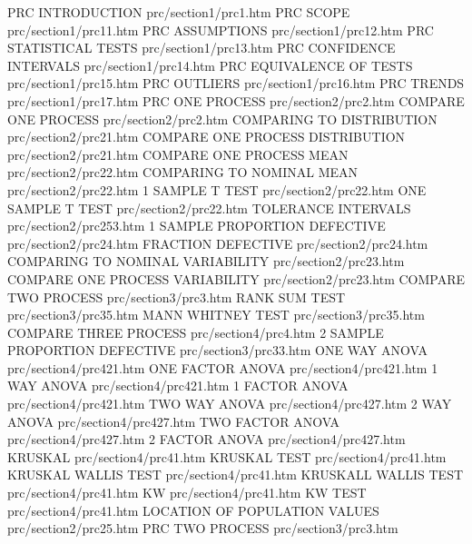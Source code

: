 PRC INTRODUCTION                        prc/section1/prc1.htm
PRC SCOPE                               prc/section1/prc11.htm
PRC ASSUMPTIONS                         prc/section1/prc12.htm
PRC STATISTICAL TESTS                   prc/section1/prc13.htm
PRC CONFIDENCE INTERVALS                prc/section1/prc14.htm
PRC EQUIVALENCE OF TESTS                prc/section1/prc15.htm
PRC OUTLIERS                            prc/section1/prc16.htm
PRC TRENDS                              prc/section1/prc17.htm
PRC ONE PROCESS                         prc/section2/prc2.htm
COMPARE ONE PROCESS                     prc/section2/prc2.htm
COMPARING TO DISTRIBUTION               prc/section2/prc21.htm
COMPARE ONE PROCESS DISTRIBUTION        prc/section2/prc21.htm
COMPARE ONE PROCESS MEAN                prc/section2/prc22.htm
COMPARING TO NOMINAL MEAN               prc/section2/prc22.htm
1 SAMPLE T TEST                         prc/section2/prc22.htm
ONE SAMPLE T TEST                       prc/section2/prc22.htm
TOLERANCE INTERVALS                     prc/section2/prc253.htm
1 SAMPLE PROPORTION DEFECTIVE           prc/section2/prc24.htm
FRACTION DEFECTIVE                      prc/section2/prc24.htm
COMPARING TO NOMINAL VARIABILITY        prc/section2/prc23.htm
COMPARE ONE PROCESS VARIABILITY         prc/section2/prc23.htm
COMPARE TWO PROCESS                     prc/section3/prc3.htm
RANK SUM TEST                           prc/section3/prc35.htm
MANN WHITNEY TEST                       prc/section3/prc35.htm
COMPARE THREE PROCESS                   prc/section4/prc4.htm
2 SAMPLE PROPORTION DEFECTIVE           prc/section3/prc33.htm
ONE WAY ANOVA                           prc/section4/prc421.htm
ONE FACTOR ANOVA                        prc/section4/prc421.htm
1 WAY ANOVA                             prc/section4/prc421.htm
1 FACTOR ANOVA                          prc/section4/prc421.htm
TWO WAY ANOVA                           prc/section4/prc427.htm
2 WAY ANOVA                             prc/section4/prc427.htm
TWO FACTOR ANOVA                        prc/section4/prc427.htm
2 FACTOR ANOVA                          prc/section4/prc427.htm
KRUSKAL                                 prc/section4/prc41.htm
KRUSKAL TEST                            prc/section4/prc41.htm
KRUSKAL WALLIS TEST                     prc/section4/prc41.htm
KRUSKALL WALLIS TEST                    prc/section4/prc41.htm
KW                                      prc/section4/prc41.htm
KW TEST                                 prc/section4/prc41.htm
LOCATION OF POPULATION VALUES           prc/section2/prc25.htm
PRC TWO PROCESS                         prc/section3/prc3.htm
